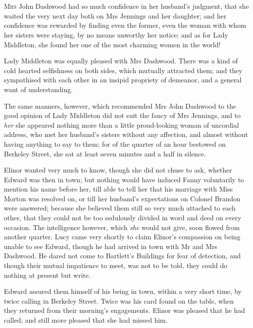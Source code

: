 \chapter[Chapter \thechapter]{}
\lettrine[lines=4,lraise=0.3]{M}{rs} John Dashwood had so much confidence in her husband’s judgment, that she waited the very next day both on Mrs Jennings and her daughter; and her confidence was rewarded by finding even the former, even the woman with whom her sisters were staying, by no means unworthy her notice; and as for Lady Middleton, she found her one of the most charming women in the world!

Lady Middleton was equally pleased with Mrs Dashwood. There was a kind of cold hearted selfishness on both sides, which mutually attracted them; and they sympathised with each other in an insipid propriety of demeanor, and a general want of understanding.

The same manners, however, which recommended Mrs John Dashwood to the good opinion of Lady Middleton did not suit the fancy of Mrs Jennings, and to \textit{her} she appeared nothing more than a little proud-looking woman of uncordial address, who met her husband’s sisters without any affection, and almost without having anything to say to them; for of the quarter of an hour bestowed on Berkeley Street, she sat at least seven minutes and a half in silence.

Elinor wanted very much to know, though she did not chuse to ask, whether Edward was then in town; but nothing would have induced Fanny voluntarily to mention his name before her, till able to tell her that his marriage with Miss Morton was resolved on, or till her husband’s expectations on Colonel Brandon were answered; because she believed them still so very much attached to each other, that they could not be too sedulously divided in word and deed on every occasion. The intelligence however, which \textit{she} would not give, soon flowed from another quarter. Lucy came very shortly to claim Elinor’s compassion on being unable to see Edward, though he had arrived in town with Mr and Mrs Dashwood. He dared not come to Bartlett’s Buildings for fear of detection, and though their mutual impatience to meet, was not to be told, they could do nothing at present but write.

Edward assured them himself of his being in town, within a very short time, by twice calling in Berkeley Street. Twice was his card found on the table, when they returned from their morning’s engagements. Elinor was pleased that he had called; and still more pleased that she had missed him.

